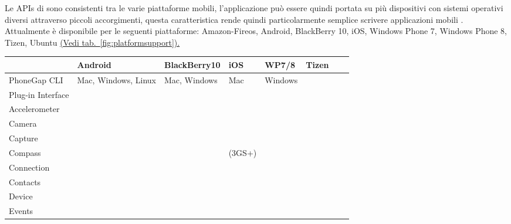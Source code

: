             Le APIs di \pg{} sono consistenti tra le varie piattaforme mobili,
            l'applicazione può essere quindi portata su più dispositivi con
            sistemi operativi diversi attraverso piccoli accorgimenti, questa
            caratteristica rende quindi particolarmente semplice scrivere
            applicazioni mobili \crossplat{}.
            Attualmente \pg{} è disponibile per le seguenti piattaforme:
            Amazon-Fireos, Android, BlackBerry 10, iOS, Windows Phone 7,
            Windows Phone 8, Tizen, Ubuntu \hyperref[fig:platformsupport]{(Vedi
            tab.~\ref{fig:platformsupport}).}
            {\footnotesize
                \begin{table}
                    \begin{tabularx}{\textwidth}{|l*{7}{|s}|}
                        \hline
                          & Android & Black\-Berry10 & iOS & WP7/8
                        & Tizen
                        \tabularnewline
                        \hline
                        PhoneGap CLI &\sprt{} Mac, Windows, Linux &
                        \sprt{} Mac, Windows & \sprt{} Mac & \sprt{} Windows & \notsprt{}
                        \tabularnewline
                        \hline
                        Plug-in Interface & \sprt{} & \sprt{} & \sprt{} & \sprt{} &
                        \notsprt{}
                        \tabularnewline
                        \hline
                        Accelerometer & \sprt{} & \sprt{} & \sprt{} & \sprt{} & \sprt{}
                        \tabularnewline
                        \hline
                        Camera & \sprt{} & \sprt{} & \sprt{} & \sprt{} & \sprt{}
                        \tabularnewline
                        \hline
                        Capture & \sprt{} & \sprt{} & \sprt{} & \sprt{} & \notsprt{}
                        \tabularnewline
                        \hline
                        Compass & \sprt{} & \sprt{} & \sprt{} (3GS+)& \sprt{} & \sprt{}
                        \tabularnewline
                        \hline
                        Connection & \sprt{} & \sprt{} & \sprt{} & \sprt{} & \sprt{}
                        \tabularnewline
                        \hline
                        Contacts & \sprt{} & \sprt{} & \sprt{} & \sprt{} & \notsprt{}
                        \tabularnewline
                        \hline
                        Device & \sprt{} & \sprt{} & \sprt{} & \sprt{} & \sprt{}
                        \tabularnewline
                        \hline
                        Events & \sprt{} & \sprt{} & \sprt{} & \sprt{} & \sprt{}

\end{tabularx}
\end{table}}
